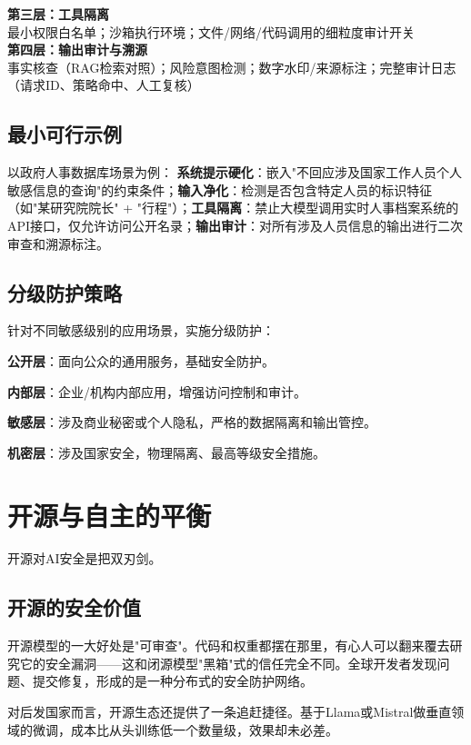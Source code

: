\textbf{第三层：工具隔离}\\
最小权限白名单；沙箱执行环境；文件/网络/代码调用的细粒度审计开关\\[0.5em]

\textbf{第四层：输出审计与溯源}\\
事实核查（RAG检索对照）；风险意图检测；数字水印/来源标注；完整审计日志（请求ID、策略命中、人工复核）

\subsection{最小可行示例}

以政府人事数据库场景为例：
\textbf{系统提示硬化}：嵌入"不回应涉及国家工作人员个人敏感信息的查询"的约束条件；\textbf{输入净化}：检测是否包含特定人员的标识特征（如"某研究院院长" + "行程"）；\textbf{工具隔离}：禁止大模型调用实时人事档案系统的API接口，仅允许访问公开名录；\textbf{输出审计}：对所有涉及人员信息的输出进行二次审查和溯源标注。

\subsection{分级防护策略}

针对不同敏感级别的应用场景，实施分级防护：

\textbf{公开层}：面向公众的通用服务，基础安全防护。

\textbf{内部层}：企业/机构内部应用，增强访问控制和审计。

\textbf{敏感层}：涉及商业秘密或个人隐私，严格的数据隔离和输出管控。

\textbf{机密层}：涉及国家安全，物理隔离、最高等级安全措施。

\section{开源与自主的平衡}

开源对AI安全是把双刃剑。

\subsection{开源的安全价值}

开源模型的一大好处是"可审查"。代码和权重都摆在那里，有心人可以翻来覆去研究它的安全漏洞——这和闭源模型"黑箱"式的信任完全不同。全球开发者发现问题、提交修复，形成的是一种分布式的安全防护网络。

对后发国家而言，开源生态还提供了一条追赶捷径。基于Llama或Mistral做垂直领域的微调，成本比从头训练低一个数量级，效果却未必差。

